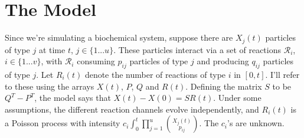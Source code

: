 \documentclass{article}
\begin{document}
%
% 

\section{The Model}
Since we're simulating a biochemical system, suppose there are $X_{j}(t)$ particles of type $j$ at time $t$, $j\in \{1 ... u\}$. These particles interact via a set of reactions $\mathcal{R}_{i}$, $i\in \{1 ... v\}$, with $\mathcal{R}_{i}$ consuming $p_{ij}$ particles of type $j$ and producing $q_{ij}$ particles of type $j$. Let $R_{i}(t)$ denote the number of reactions of type $i$ in $[0,t]$. I'll refer to these using the arrays $X(t)$, $P$, $Q$ and $R(t)$. Defining the matrix $S$ to be $Q^T-P^T$, the model says that $X(t) - X(0) = SR(t)$. Under some assumptions, the different reaction channels evolve independently, and $R_{i}(t)$ is a Poisson process with intensity $c_{i}\int_0^t \prod_{j=1}^u {{X_j(t)}\choose{p_{ij}}}$. %
The $c_{i}$'s are unknown.
\end{document}
